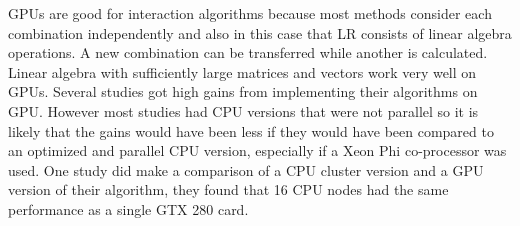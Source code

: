 \documentclass[10pt,a4paper]{report}
\begin{document}
GPUs are good for interaction algorithms because most methods consider each combination independently and also in this case that LR consists of linear algebra operations. A new combination can be transferred while another is calculated. Linear algebra with sufficiently large matrices and vectors work very well on GPUs\cite{cublas, cuda}. Several studies got high gains from implementing their algorithms on GPU\cite{gwis,gboost,gmdr_gpu,cuda_lr,genie_2012,plink_gpu}. However most studies had CPU versions that were not parallel so it is likely that the gains would have been less if they would have been compared to an optimized and parallel CPU version, especially if a Xeon Phi co-processor was used. One study did make a comparison of a CPU cluster version and a GPU version of their algorithm, they found that 16 CPU nodes had the same performance as a single GTX 280 card\cite{jiang_accelerating}.








\end{document}
